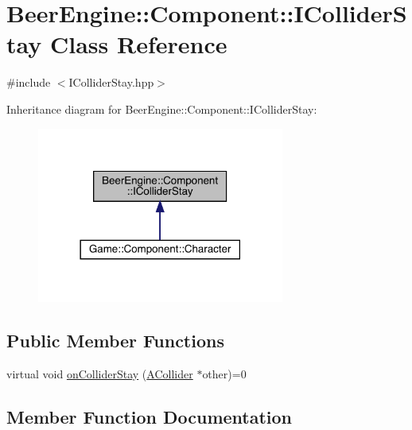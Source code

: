 \hypertarget{class_beer_engine_1_1_component_1_1_i_collider_stay}{}\section{Beer\+Engine\+:\+:Component\+:\+:I\+Collider\+Stay Class Reference}
\label{class_beer_engine_1_1_component_1_1_i_collider_stay}


{\ttfamily \#include $<$I\+Collider\+Stay.\+hpp$>$}



Inheritance diagram for Beer\+Engine\+:\+:Component\+:\+:I\+Collider\+Stay\+:
\nopagebreak
\begin{figure}[H]
\begin{center}
\leavevmode
\includegraphics[width=230pt]{class_beer_engine_1_1_component_1_1_i_collider_stay__inherit__graph}
\end{center}
\end{figure}
\subsection*{Public Member Functions}
\begin{DoxyCompactItemize}
\item 
virtual void \mbox{\hyperlink{class_beer_engine_1_1_component_1_1_i_collider_stay_a462a0eb147235000265ed3f29d8b343e}{on\+Collider\+Stay}} (\mbox{\hyperlink{class_beer_engine_1_1_component_1_1_a_collider}{A\+Collider}} $\ast$other)=0
\end{DoxyCompactItemize}


\subsection{Member Function Documentation}
\mbox{\label{class_beer_engine_1_1_component_1_1_i_collider_stay_a462a0eb147235000265ed3f29d8b343e}} 
